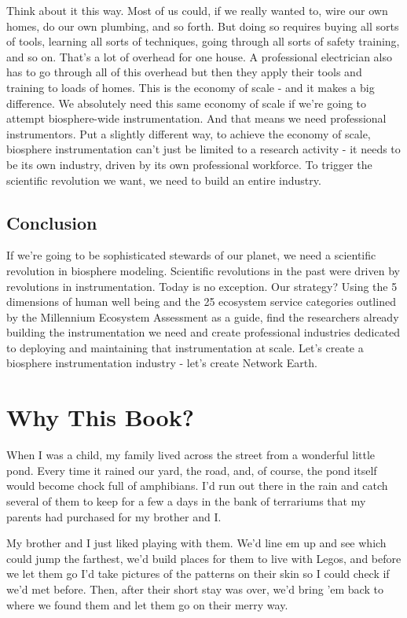 \documentclass[11pt,a5paper]{book}
\begin{document}
Think about it this way. Most of us could, if we really wanted to, wire our own homes, do our own plumbing, and so forth. But doing so requires buying all sorts of tools, learning all sorts of techniques, going through all sorts of safety training, and so on. That's a lot of overhead for one house. A professional electrician also has to go through all of this overhead but then they apply their tools and training to loads of homes. This is the economy of scale - and it makes a big difference. We absolutely need this same economy of scale if we're going to attempt biosphere-wide instrumentation. And that means we need professional instrumentors. Put a slightly different way, to achieve the economy of scale, biosphere instrumentation can't just be limited to a research activity - it needs to be its own industry, driven by its own professional workforce. To trigger the scientific revolution we want, we need to build an entire industry.
\newline

\section{Conclusion}

If we're going to be sophisticated stewards of our planet, we need a scientific revolution in biosphere modeling. Scientific revolutions in the past were driven by revolutions in instrumentation. Today is no exception. Our strategy? Using the 5 dimensions of human well being and the 25 ecosystem service categories outlined by the Millennium Ecosystem Assessment as a guide, find the researchers already building the instrumentation we need and create professional industries dedicated to deploying and maintaining that instrumentation at scale. Let's create a biosphere instrumentation industry - let's create Network Earth.

\chapter{Why This Book?}
When I was a child, my family lived across the street from a wonderful little pond. Every time it rained our yard, the road, and, of course, the pond itself would become chock full of amphibians. I'd run out there in the rain and catch several of them to keep for a few a days in the bank of terrariums that my parents had purchased for my brother and I.
\newline

My brother and I just liked playing with them. We'd line em up and see which could jump the farthest, we'd build places for them to live with Legos, and before we let them go I'd take pictures of the patterns on their skin so I could check if we'd met before. Then, after their short stay was over, we'd bring 'em back to where we found them and let them go on their merry way.
\newline
\end{document}
